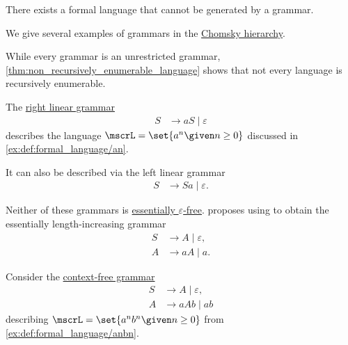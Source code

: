 \begin{proposition}\label{thm:non_recursively_enumerable_language}
  There exists a formal language that cannot be generated by a grammar.
\end{proposition}

\begin{example}\label{ex:def:chomsky_hierarchy}
  We give several examples of grammars in the \hyperref[def:chomsky_hierarchy]{Chomsky hierarchy}.

  \begin{thmenum}
     While every grammar is an unrestricted grammar, \cref{thm:non_recursively_enumerable_language} shows that not every language is recursively enumerable.

     The \hyperref[def:chomsky_hierarchy/regular]{right linear grammar}
    \begin{equation*}
      \begin{aligned}
        S &\to aS \mid \varepsilon
      \end{aligned}
    \end{equation*}
    describes the language \( \mscrL = \set{ a^n \given n \geq 0 } \) discussed in \cref{ex:def:formal_language/an}.

    It can also be described via the left linear grammar
    \begin{equation*}
      \begin{aligned}
        S &\to Sa \mid \varepsilon.
      \end{aligned}
    \end{equation*}

    Neither of these grammars is \hyperref[def:epsilon_free_grammar]{essentially \( \varepsilon \)-free}.  proposes using  to obtain the essentially length-increasing grammar
    \begin{equation*}
      \begin{aligned}
        S &\to A \mid \varepsilon, \\
        A &\to aA \mid a.
      \end{aligned}
    \end{equation*}

     Consider the \hyperref[def:chomsky_hierarchy/context_free]{context-free grammar}
    \begin{equation*}
      \begin{aligned}
        S &\to A \mid \varepsilon, \\
        A &\to aAb \mid ab
      \end{aligned}
    \end{equation*}
    describing \( \mscrL = \set{ a^n b^n \given n \geq 0 } \) from \cref{ex:def:formal_language/anbn}.


\end{thmenum}
\end{example}
